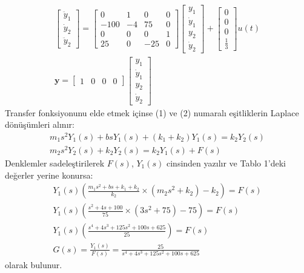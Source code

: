 \documentclass[a4paper,11pt]{article}
\begin{document}
\begin{enumerate}[label=\textbf{\alph*}{.}]
\begin{gather*}
\begin{bmatrix}
        \ddot{y}_1 \\
        \dot{y}_2 \\
        \ddot{y}_2
    \end{bmatrix}
    =
    \begin{bmatrix}
        0 & 1 & 0 & 0 \\
        -100 & -4 & 75 & 0 \\
        0 & 0 & 0 & 1 \\
        25 & 0 & -25 & 0
    \end{bmatrix}
    \begin{bmatrix}
        y_1 \\ \dot{y}_1 \\ y_2 \\ \dot{y}_2
    \end{bmatrix}
    +
    \begin{bmatrix}
        0 \\ 0 \\ 0 \\ \frac{1}{3}
    \end{bmatrix}
    u(t) \\[1em]
    \mathbf{y} = \begin{bmatrix}
        1 & 0 & 0 & 0
    \end{bmatrix}
    \begin{bmatrix}
        y_1 \\ \dot{y}_1 \\ y_2 \\ \dot{y}_2
    \end{bmatrix}
\end{gather*}
Transfer fonksiyonunu elde etmek içinse (1) ve (2) numaralı eşitliklerin Laplace dönüşümleri alınır:
\begin{gather*}
    m_1 s^2 Y_1(s) + b s Y_1(s) + (k_1 + k_2) Y_1(s) = k_2 Y_2(s) \\
    m_2 s^2 Y_2(s) + k_2 Y_2(s) = k_2 Y_1(s) + F(s)
\end{gather*}
Denklemler sadeleştirilerek $F(s)$, $Y_1(s)$ cinsinden yazılır ve Tablo 1'deki değerler yerine konursa:
\begin{gather*}
    Y_1(s)\left(\frac{m_1 s^2 + b s + k_1 + k_2}{k_2} \times (m_2 s^2 + k_2) - k_2\right) = F(s)\\
    Y_1(s)\left(\frac{s^2 + 4s + 100}{75} \times (3s^2 + 75) - 75\right) = F(s)\\
    Y_1(s)\left(\frac{s^4 + 4s^3 + 125s^2 + 100s + 625}{25}\right) = F(s)  \\[0.8em]
    G(s) = \frac{Y_1(s)}{F(s)} = \frac{25}{s^4 + 4s^3 + 125s^2 + 100s + 625}
\end{gather*}
olarak bulunur.


\end{enumerate}
\end{document}
